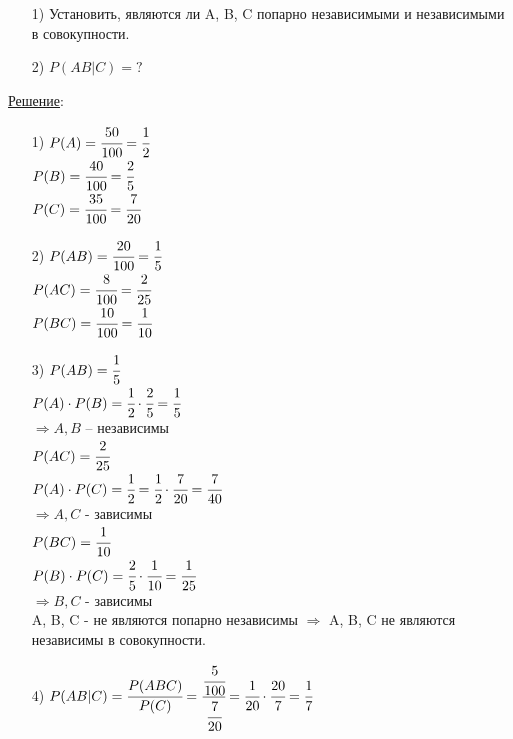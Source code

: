 \begin{enumerate}
\item[1)] Установить, являются ли A, B, C попарно независимыми и независимыми в совокупности.

\item[2)] $P(AB|C) = ?$
\end{enumerate}
\underline{Решение}: 
\begin{enumerate}
\item[1)] $P(A) = \cfrac{50}{100} = \cfrac{1}{2}$ \\
$P(B) = \cfrac{40}{100} = \cfrac{2}{5}$ \\
$P(C) = \cfrac{35}{100} = \cfrac{7}{20}$ \\ 

\item[2)] $P(AB) = \cfrac{20}{100} = \cfrac{1}{5}$ \\
$P(AC) = \cfrac{8}{100} = \cfrac{2}{25}$ \\
$P(BC) = \cfrac{10}{100} = \cfrac{1}{10}$ \\

\item[3)] $P(AB) = \cfrac{1}{5}$ \\
$P(A) \cdot P(B) = \cfrac{1}{2} \cdot \cfrac{2}{5} = \cfrac{1}{5}$ \\
$\Rightarrow A,B$ -- независимы \\

$P(AC) = \cfrac{2}{25}$ \\
$P(A) \cdot P(C) = \cfrac{1}{2} = \cfrac{1}{2} \cdot \cfrac{7}{20} = \cfrac{7}{40}$ \\
$\Rightarrow A,C$ - зависимы \\

$P(BC) = \cfrac{1}{10}$ \\ 
$P(B) \cdot P(C) = \cfrac{2}{5} \cdot \cfrac{1}{10} = \cfrac{1}{25}$ \\
$\Rightarrow B,C$ - зависимы \\

A, B, C - не являются попарно независимы $\Rightarrow$ A, B, C не являются независимы в совокупности.

\item[4)] $P(AB|C) = \cfrac{P(ABC)}{P(C)} = \cfrac{\cfrac{5}{100}}{\cfrac{7}{20}} = \cfrac{1}{20} \cdot \cfrac{20}{7} = \cfrac{1}{7}$ \\
\end{enumerate}






















